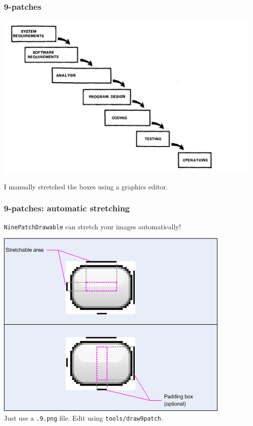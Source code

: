 \begin{frame}
\frametitle{9-patches}

\begin{changemargin}{1cm}

\includegraphics[height=.7\textheight]{images/concurrent-engineering.png}

I manually stretched the boxes using a graphics editor.\\[1em]

\end{changemargin}
\end{frame}

\begin{frame}
\frametitle{9-patches: automatic stretching}

\begin{changemargin}{1cm}
{\tt NinePatchDrawable} can stretch your images automatically!

\includegraphics[height=.7\textheight]{images/ninepatch_raw}\\

Just use a {\tt .9.png} file.  Edit using {\tt tools/draw9patch}.
\end{changemargin}
\end{frame}






